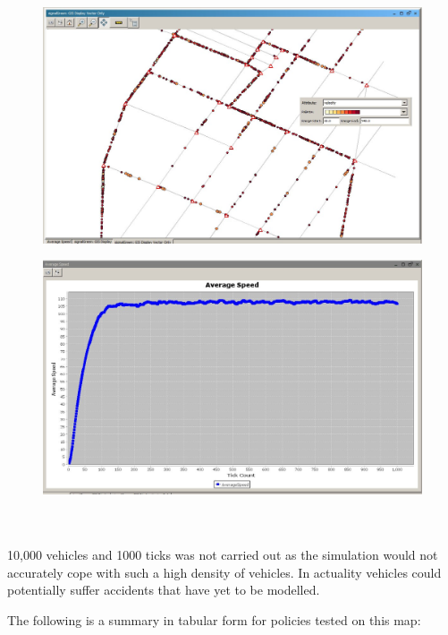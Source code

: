 \documentclass[11pt]{article}
\begin{document}
\begin{enumerate}
\begin{figure}[h!]
\begin{center}
\includegraphics[scale=0.4]{AVG speed}
\caption{}
\end{center}
\end{figure}
\begin{figure}[h!]
\begin{center}
\includegraphics[scale=0.2]{screen_shot}
\caption{}
\end{center}
\end{figure}\hfill \\
\hfill \\

10,000 vehicles and 1000 ticks was not carried out as the simulation would not accurately cope with such a high density of vehicles. In actuality vehicles could potentially suffer accidents that have yet to be modelled. 

The following is a summary in tabular form for policies tested on this map:



\end{enumerate}
\end{document}
